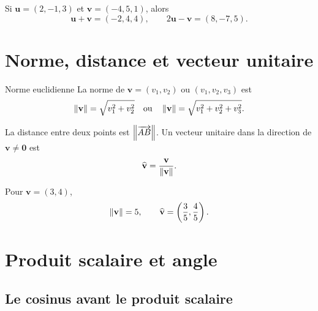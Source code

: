 \begin{center}
\end{center}

\begin{examplebox}
Si $\mathbf u=(2,-1,3)$ et $\mathbf v=(-4,5,1)$, alors
\[
\mathbf u+\mathbf v=(-2,4,4),
\qquad
2\mathbf u-\mathbf v=(8,-7,5).
\]
\end{examplebox}

\section{Norme, distance et vecteur unitaire}
\label{manual:section:09.03}

\begin{definition}{Norme euclidienne}{}
La norme de $\mathbf v=(v_1,v_2)$ ou $(v_1,v_2,v_3)$ est
\[
\left\lVert \mathbf v\right\rVert=\sqrt{v_1^2+v_2^2}
\quad\text{ou}\quad
\left\lVert \mathbf v\right\rVert=\sqrt{v_1^2+v_2^2+v_3^2}.
\]
\end{definition}

La distance entre deux points est $\left\lVert \overrightarrow{AB}\right\rVert$. Un vecteur unitaire dans la direction de $\mathbf v\neq\mathbf0$ est
\[
\widehat{\mathbf v}=\frac{\mathbf v}{\left\lVert \mathbf v\right\rVert}.
\]

\begin{examplebox}
Pour $\mathbf v=(3,4)$,
\[
\left\lVert \mathbf v\right\rVert=5,
\qquad
\widehat{\mathbf v}=\left(\frac35,\frac45\right).
\]
\end{examplebox}

\section{Produit scalaire et angle}
\label{manual:section:09.04}

\subsection{Le cosinus avant le produit scalaire}


